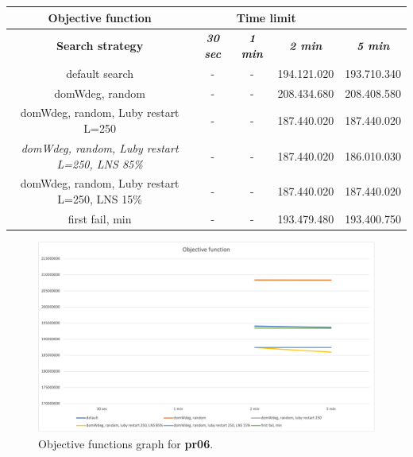 {
\renewcommand{\arraystretch}{2}
\begin{longtable}[h]{| c | c | c | c | c |}
    \hline
    \textbf{Objective function} & \multicolumn{3}{c}{\textbf{Time limit}} & \\
    \hline
    \textbf{Search strategy} & \textbf{\textit{30 sec}} & \textbf{\textit{1 min}} & \textbf{\textit{2 min}} & \textbf{\textit{5 min}} \\
    \hline
    \endhead
    default search                                         & - & - & 194.121.020 & 193.710.340 \\
    \hline
    domWdeg, random                                        & - & - & 208.434.680 & 208.408.580 \\
    \hline
    domWdeg, random, Luby restart L=250                    & - & - & 187.440.020 & 187.440.020 \\
    \hline
    \textit{domWdeg, random, Luby restart L=250, LNS 85\%} & - & - & 187.440.020 & 186.010.030 \\
    \hline
    domWdeg, random, Luby restart L=250, LNS 15\%          & - & - & 187.440.020 & 187.440.020 \\
    \hline
    first fail, min                                        & - & - & 193.479.480 & 193.400.750 \\
    \hline
\end{longtable}
}
\begin{figure}[H]
    \centering
    \includegraphics[width=0.8\columnwidth]{../graphs/pr06-objf.png}
    \caption{Objective functions graph for \textbf{pr06}.}
\end{figure}

